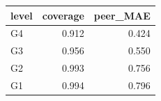 \begin{tabular}{lrr}
\toprule
level & coverage & peer_MAE \\
\midrule
G4 & 0.912 & 0.424 \\
G3 & 0.956 & 0.550 \\
G2 & 0.993 & 0.756 \\
G1 & 0.994 & 0.796 \\
\bottomrule
\end{tabular}
